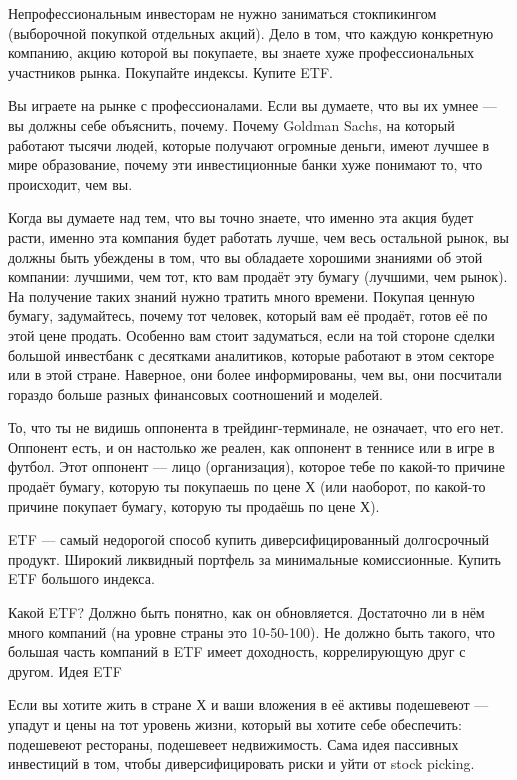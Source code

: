 \documentclass[11pt]{article}
\theoremstyle{remark}
\theoremstyle{definition}
\begin{document}
\begin{enumerate}
Непрофессиональным инвесторам не нужно заниматься стокпикингом (выборочной покупкой отдельных акций). Дело в том, что каждую конкретную компанию, акцию которой вы покупаете, вы знаете хуже профессиональных участников рынка. Покупайте индексы. Купите ETF. 

Вы играете на рынке с профессионалами. Если вы думаете, что вы их умнее --- вы должны себе объяснить, почему. Почему Goldman Sachs, на который работают тысячи людей, которые получают огромные деньги, имеют лучшее в мире образование, почему эти инвестиционные банки хуже понимают то, что происходит, чем вы.

Когда вы думаете над тем, что вы точно знаете, что именно эта акция будет расти, именно эта компания будет работать лучше, чем весь остальной рынок, вы должны быть убеждены в том, что вы обладаете хорошими знаниями об этой компании: лучшими, чем тот, кто вам продаёт эту бумагу (лучшими, чем рынок). На получение таких знаний нужно тратить много времени. Покупая ценную бумагу, задумайтесь, почему тот человек, который вам её продаёт, готов её по этой цене продать. Особенно вам стоит задуматься, если на той стороне сделки большой инвестбанк с десятками аналитиков, которые работают в этом секторе или в этой стране. Наверное, они более информированы, чем вы, они посчитали гораздо больше разных финансовых соотношений и моделей. 

То, что ты не видишь оппонента в трейдинг-терминале, не означает, что его нет. Оппонент есть, и он настолько же реален, как оппонент в теннисе или в игре в футбол. Этот оппонент --- лицо (организация), которое тебе по какой-то причине продаёт бумагу, которую ты покупаешь по цене Х (или наоборот, по какой-то причине покупает бумагу, которую ты продаёшь по цене Х).

ETF --- самый недорогой способ купить диверсифицированный долгосрочный продукт. Широкий ликвидный портфель за минимальные комиссионные. Купить ETF большого индекса. 

Какой ETF? Должно быть понятно, как он обновляется. Достаточно ли в нём много компаний (на уровне страны это 10-50-100). Не должно быть такого, что большая часть компаний в ETF имеет доходность, коррелирующую друг с другом. Идея ETF

Если вы хотите жить в стране Х и ваши вложения в её активы подешевеют --- упадут и цены на тот уровень жизни, который вы хотите себе обеспечить: подешевеют рестораны, подешевеет недвижимость. Сама идея пассивных инвестиций в том, чтобы диверсифицировать риски и уйти от stock picking. 


\end{enumerate}
\end{document}
